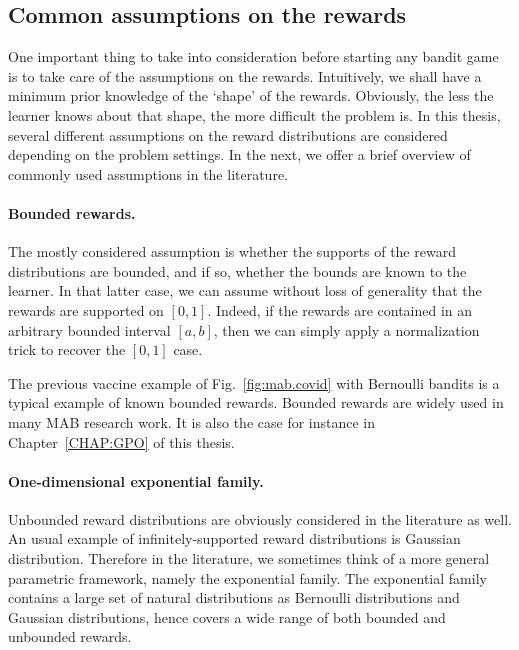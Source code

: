 \subsection{Common assumptions on the rewards}\label{sec:mab.model.assumptions}

One important thing to take into consideration before starting any bandit game is to take care of the assumptions on the rewards. Intuitively, we shall have a minimum prior knowledge of the `shape' of the rewards. Obviously, the less the learner knows about that shape, the more difficult the problem is. In this thesis, several different assumptions on the reward distributions are considered depending on the problem settings. In the next, we offer a brief overview of commonly used assumptions in the literature.

\paragraph{Bounded rewards.}

The mostly considered assumption is whether the supports of the reward distributions are bounded, and if so, whether the bounds are known to the learner. In that latter case, we can assume without loss of generality that the rewards are supported on $[0,1]$. Indeed, if the rewards are contained in an arbitrary bounded interval $[a,b]$, then we can simply apply a normalization trick to recover the $[0,1]$ case.

The previous vaccine example of Fig.~\ref{fig:mab.covid} with Bernoulli bandits is a typical example of known bounded rewards. Bounded rewards are widely used in many MAB research work. It is also the case for instance in Chapter~\ref{CHAP:GPO} of this thesis.

\paragraph{One-dimensional exponential family.}

Unbounded reward distributions are obviously considered in the literature as well. An usual example of infinitely-supported reward distributions is Gaussian distribution. Therefore in the literature, we sometimes think of a more general parametric framework, namely the exponential family. The exponential family contains a large set of natural distributions as Bernoulli distributions and Gaussian distributions, hence covers a wide range of both bounded and unbounded rewards.

